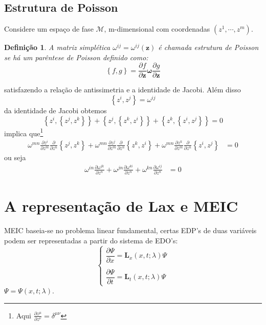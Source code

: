\documentclass[25pt]{article}
\numberwithin{equation}{subsection} %
\newtheorem{defi}{Definição}
\newcommand{\poisson}[2]{\left\{#1,#2\right\}}
\newcommand{\bz}{\mathbf{z}}
\begin{document}
\subsection{Estrutura de Poisson}

Considere um espaço de fase $\mathcal{M}$, m-dimensional com coordenadas $\left(z^{1},\cdots,z^{m}\right)$.
\begin{defi}
	A matriz simplética $\omega^{ij}=\omega^{ij}(\mathbf{z})$ é chamada \textit{estrutura de Poisson} se há um parêntese de Poisson definido como:
	\begin{equation}
	\poisson{f}{g}=\frac{\partial f}{\partial \bz}\bm{\omega}\frac{\partial g}{\partial \bz}
	\end{equation}
\end{defi}
satisfazendo a relação de antissimetria e a identidade de Jacobi. Além disso
\begin{equation}
\poisson{z^{i}}{z^{j}}=\omega^{ij}
\end{equation}
da identidade de Jacobi obtemos
\begin{equation}
\poisson{z^{i}}{\poisson{z^{j}}{z^{k}}}+\poisson{z^{j}}{\poisson{z^{k}}{z^{i}}}+\poisson{z^{k}}{\poisson{z^{i}}{z^{j}}}=0
\end{equation}
implica que\footnote{Aqui $\displaystyle \frac{\partial z^\mu}{\partial z^{\nu}}=\delta^{\mu\nu}$}
\begin{align}
\omega^{mn}\frac{\partial z^{i}}{\partial z^{m}}\frac{\partial}{\partial z^{n}}\poisson{z^{j}}{z^{k}}+\omega^{mn}\frac{\partial z^{j}}{\partial z^{m}}\frac{\partial}{\partial z^{n}}\poisson{z^{k}}{z^{i}}+\omega^{mn}\frac{\partial z^{k}}{\partial z^{m}}\frac{\partial}{\partial z^{n}}\poisson{z^{i}}{z^{j}}&=0
\end{align}
ou seja
\begin{align}
\omega^{in}\frac{\partial \omega^{jk}}{\partial z^{n}}+\omega^{jn}\frac{\partial \omega^{ki}}{\partial z^{n}}+\omega^{kn}\frac{\partial\omega^{ij}}{\partial z^{n}}&=0
\end{align}

\section{A representação de Lax e MEIC}

MEIC baseia-se no problema linear fundamental, certas EDP's de duas variáveis podem ser representadas a partir do sistema de EDO's:
\begin{equation}\label{PLF}
\begin{cases}
\dfrac{\partial \bm{\varPsi}}{\partial x}=\mathbf{L}_{x}\left(x,t;\lambda\right)\bm{\varPsi}\\
~\\
\dfrac{\partial \bm{\varPsi}}{\partial t}=\mathbf{L}_{t}\left(x,t;\lambda\right)\bm{\varPsi}
\end{cases}
\end{equation}
$\bm{\varPsi}=\bm{\varPsi}\left(x,t;\lambda\right)$. 
\end{document}

